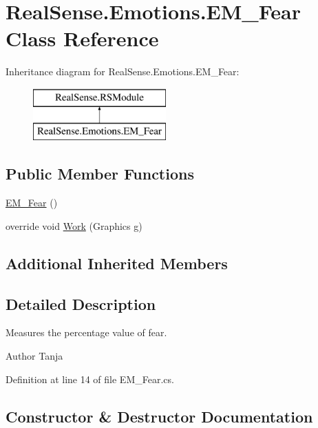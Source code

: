 \hypertarget{class_real_sense_1_1_emotions_1_1_e_m___fear}{}\section{Real\+Sense.\+Emotions.\+E\+M\+\_\+\+Fear Class Reference}
\label{class_real_sense_1_1_emotions_1_1_e_m___fear}
Inheritance diagram for Real\+Sense.\+Emotions.\+E\+M\+\_\+\+Fear\+:\begin{figure}[H]
\begin{center}
\leavevmode
\includegraphics[height=2.000000cm]{class_real_sense_1_1_emotions_1_1_e_m___fear}
\end{center}
\end{figure}
\subsection*{Public Member Functions}
\begin{DoxyCompactItemize}
\item 
\hyperlink{class_real_sense_1_1_emotions_1_1_e_m___fear_af5fb3d9f1043968e5b673c5cfc478f97}{E\+M\+\_\+\+Fear} ()
\item 
override void \hyperlink{class_real_sense_1_1_emotions_1_1_e_m___fear_a5b417a4a8403f101585dc8c239288c54}{Work} (Graphics g)
\end{DoxyCompactItemize}
\subsection*{Additional Inherited Members}


\subsection{Detailed Description}
Measures the percentage value of fear. \begin{DoxyAuthor}{Author}
Tanja 
\end{DoxyAuthor}


Definition at line 14 of file E\+M\+\_\+\+Fear.\+cs.



\subsection{Constructor \& Destructor Documentation}
\mbox{\label{class_real_sense_1_1_emotions_1_1_e_m___fear_af5fb3d9f1043968e5b673c5cfc478f97}} 
